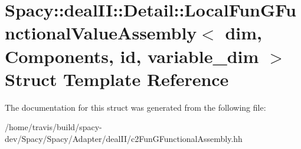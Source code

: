\hypertarget{structSpacy_1_1dealII_1_1Detail_1_1LocalFunGFunctionalValueAssembly}{\section{Spacy\-:\-:deal\-I\-I\-:\-:Detail\-:\-:Local\-Fun\-G\-Functional\-Value\-Assembly$<$ dim, Components, id, variable\-\_\-dim $>$ Struct Template Reference}
\label{structSpacy_1_1dealII_1_1Detail_1_1LocalFunGFunctionalValueAssembly}
}


The documentation for this struct was generated from the following file\-:\begin{DoxyCompactItemize}
\item 
/home/travis/build/spacy-\/dev/\-Spacy/\-Spacy/\-Adapter/deal\-I\-I/c2\-Fun\-G\-Functional\-Assembly.\-hh\end{DoxyCompactItemize}
